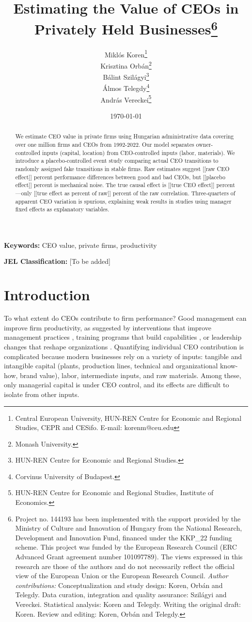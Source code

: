 \documentclass[11pt,a4paper]{article}
\title{Estimating the Value of CEOs in Privately Held Businesses\thanks{Project no. 144193 has been implemented with the support provided by the Ministry of Culture and Innovation of Hungary from the National Research, Development and Innovation Fund, financed under the KKP\_22 funding scheme. This project was funded by the European Research Council (ERC Advanced Grant agreement number 101097789). The views expressed in this research are those of the authors and do not necessarily reflect the official view of the European Union or the European Research Council. \emph{Author contributions:} Conceptualization and study design: Koren, Orbán and Telegdy. Data curation, integration and quality assurance: Szilágyi and Vereckei. Statistical analysis: Koren and Telegdy. Writing the original draft: Koren. Review and editing: Koren, Orbán and Telegdy.}}
\author{Miklós Koren\thanks{Central European University, HUN-REN Centre for Economic and Regional Studies, CEPR and CESifo. E-mail: korenm@ceu.edu} \\
        Krisztina Orbán\thanks{Monash University.} \\
        Bálint Szilágyi\thanks{HUN-REN Centre for Economic and Regional Studies.} \\
        Álmos Telegdy\thanks{Corvinus University of Budapest.} \\
        András Vereckei\thanks{HUN-REN Centre for Economic and Regional Studies, Institute of Economics.}}
\date{\today}
\begin{document}
\maketitle

\begin{abstract}
We estimate CEO value in private firms using Hungarian administrative data covering over one million firms and CEOs from 1992-2022. Our model separates owner-controlled inputs (capital, location) from CEO-controlled inputs (labor, materials). We introduce a placebo-controlled event study comparing actual CEO transitions to randomly assigned fake transitions in stable firms. Raw estimates suggest [[raw CEO effect]] percent performance differences between good and bad CEOs, but [[placebo effect]] percent is mechanical noise. The true causal effect is [[true CEO effect]] percent—only [[true effect as percent of raw]] percent of the raw correlation. Three-quarters of apparent CEO variation is spurious, explaining weak results in studies using manager fixed effects as explanatory variables.
\end{abstract}

\textbf{Keywords:} CEO value, private firms, productivity

\textbf{JEL Classification:} [To be added]

\newpage

\section{Introduction}

To what extent do CEOs contribute to firm performance? Good management can improve firm productivity, as suggested by interventions that improve management practices \citep{bloom2013does}, training programs that build capabilities \citep{mckenzie2021small}, or leadership changes that reshape organizations \citep{Bertrand2003-io,bennedsen2020ceos,metcalfe2023managers}. Quantifying individual CEO contribution is complicated because modern businesses rely on a variety of inputs: tangible and intangible capital (plants, production lines, technical and organizational know-how, brand value), labor, intermediate inputs, and raw materials. Among these, only managerial capital is under CEO control, and its effects are difficult to isolate from other inputs.
\end{document}
